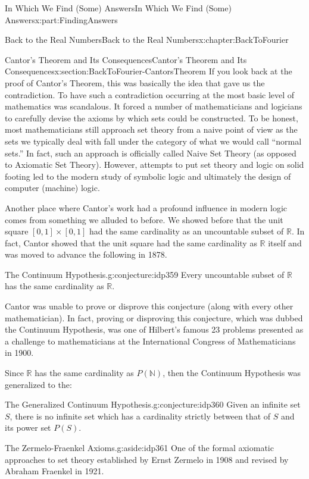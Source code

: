\documentclass[oneside,10pt,]{book}
\numberwithin{equation}{section}
\newcommand{\RR}{\mathbb {R}}
\newcommand{\NN}{\mathbb {N}}
\begin{document}
\begin{partptx}{In Which We Find (Some) Answers}{}{In Which We Find (Some) Answers}{}{}{x:part:FindingAnswers}
\begin{chapterptx}{Back to the Real Numbers}{}{Back to the Real Numbers}{}{}{x:chapter:BackToFourier}
\begin{sectionptx}{Cantor's Theorem and Its Consequences}{}{Cantor's Theorem and Its Consequences}{}{}{x:section:BackToFourier-CantorsTheorem}
If you look back at the proof of Cantor's Theorem, this was basically the idea that gave us the contradiction.  To have such a contradiction occurring at the most basic level of mathematics was scandalous.  It forced a number of mathematicians and logicians to carefully devise the axioms by which sets could be constructed. To be honest, most mathematicians still approach set theory from a naive point of view as the sets we typically deal with fall under the category of what we would call ``normal sets.'' In fact, such an approach is officially called Naive Set Theory (as opposed to Axiomatic Set Theory).  However, attempts to put set theory and logic on solid footing led to the modern study of symbolic logic and ultimately the design of computer (machine) logic.%
\par
Another place where Cantor's work had a profound influence in modern logic comes from something we alluded to before.  We showed before that the unit square \([0,1]\times [0,1]\) had the same cardinality as an uncountable subset of \(\RR\).  In fact, Cantor  showed that the unit square had the same cardinality as \(\RR\) itself and was moved to advance the following in 1878.%
\begin{conjecture}{The Continuum Hypothesis.}{}{g:conjecture:idp359}%
%
Every uncountable subset of \(\RR\) has the same cardinality as \(\RR\).%
\end{conjecture}
Cantor was unable to prove or disprove this conjecture (along with every other mathematician). In fact, proving or disproving this conjecture, which was dubbed the Continuum Hypothesis, was one of Hilbert's famous 23 problems presented as a challenge to mathematicians at the International Congress of Mathematicians in 1900.%
\par
Since \(\RR\) has the same cardinality as \(P(\NN)\), then the Continuum Hypothesis was generalized to the:%
\begin{conjecture}{The Generalized Continuum Hypothesis.}{}{g:conjecture:idp360}%
%
Given an infinite set \(S\), there is no infinite set which has a cardinality strictly between that of \(S\) and its power set \(P(S)\).%
\end{conjecture}
\begin{aside}{The Zermelo-Fraenkel Axioms.}{g:aside:idp361}%
One of the formal axiomatic approaches to set theory established by Ernst Zermelo in 1908 and revised by Abraham Fraenkel in 1921.%
\end{aside}

\end{sectionptx}
\end{chapterptx}
\end{partptx}
\end{document}

